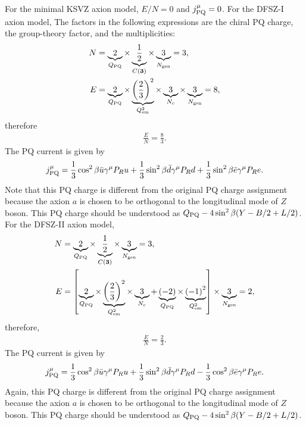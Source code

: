 \documentclass[11pt,a4paper]{article}
\begin{document}
For the minimal KSVZ axion model, $E/N = 0$ and $j_{\rm PQ}^\mu = 0$. For the DFSZ-I axion model,
The factors in the following expressions are the chiral PQ charge, the group-theory factor, and the multiplicities:
\begin{align}
    N
    &=
    \underbrace{2}_{Q_{\rm PQ}}
    \times \underbrace{\frac12}_{C({\bf 3})}
    \times \underbrace{3}_{N_{\rm gen}}
    =3,
    \\
    E
    &=
    \underbrace{2}_{Q_{\rm PQ}}
    \times \underbrace{\left(\frac23\right)^2}_{Q_{\rm em}^2}
    \times \underbrace{3}_{N_c}
    \times \underbrace{3}_{N_{\rm gen}}
    =8,
\end{align}
therefore
\begin{align}
    \frac{E}{N} = \frac{8}{3}.
\end{align}
The PQ current is given by
\begin{align}
    j_{\rm PQ}^\mu = \frac{1}{3} \cos^2\beta \bar u \gamma^\mu P_R u + \frac{1}{3}  \sin^2\beta \bar d \gamma^\mu P_R d + \frac{1}{3}  \sin^2\beta \bar e \gamma^\mu P_R e.
\end{align}
Note that this PQ charge is different from the original PQ charge assignment because the axion $a$ is chosen to be orthogonal to the longitudinal mode of $Z$ boson. This PQ charge should be understood as $Q_{\rm PQ} - 4\sin^2\beta (Y-B/2+L/2)$.
For the DFSZ-II axion model,
\begin{align}
    N
    &=
    \underbrace{2}_{Q_{\rm PQ}}
    \times \underbrace{\frac12}_{C({\bf 3})}
    \times \underbrace{3}_{N_{\rm gen}}
    =3,
    \\
    E
    &=
    \left[ \underbrace{2}_{Q_{\rm PQ}}
    \times \underbrace{\left(\frac23\right)^2}_{Q_{\rm em}^2}
    \times \underbrace{3}_{N_c}
    + \underbrace{(-2)}_{Q_{\rm PQ}}
    \times \underbrace{\left(-1\right)^2}_{Q_{\rm em}^2} \right]
    \times \underbrace{3}_{N_{\rm gen}}
    =2,
\end{align}
therefore,
\begin{align}
    \frac{E}{N} = \frac{2}{3}.
\end{align}
The PQ current is given by
\begin{align}
    j_{\rm PQ}^\mu = \frac{1}{3} \cos^2\beta \bar u \gamma^\mu P_R u + \frac{1}{3} \sin^2\beta \bar d \gamma^\mu P_R d - \frac{1}{3} \cos^2\beta \bar e \gamma^\mu P_R e.
\end{align}
Again, this PQ charge is different from the original PQ charge assignment because the axion $a$ is chosen to be orthogonal to the longitudinal mode of $Z$ boson. This PQ charge should be understood as $Q_{\rm PQ} - 4\sin^2\beta (Y-B/2+L/2)$.
\end{document}
